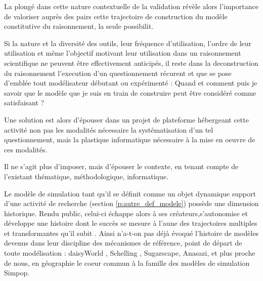 La plongé dans cette nature contextuelle de la validation révèle alors l'importance de valoriser auprès des pairs cette trajectoire de construction du modèle constitutive du raisonnement, la seule possibilit.

Si la nature et la diversité des outils, leur fréquence d'utilisation, l'ordre de leur utilisation et même l'objectif motivant leur utilisation dans un raisonnement scientifique ne peuvent être effectivement anticipés, il reste dans la deconstruction du raisonnement l'execution d'un questionnement récurent et que se pose d'emblée tout modélisateur débutant ou expérimenté : Quand et comment puis je savoir que le modèle que je suis en train de construire peut être considéré comme satisfaisant ?


Une solution est alors d'épouser dans un projet de plateforme hébergeant cette activité non pas les modalités nécessaire la systématisation d'un tel questionnement, mais la plastique informatique nécessaire à la mise en oeuvre de ces modalités. 

Il ne s'agit plus d'imposer, mais d'épouser le contexte, en tenant compte de l'existant thématique, méthodologique, informatique.


Le modèle de simulation tant qu'il se définit comme un objet dynamique support d'une activité de recherche (section \ref{p:autre_def_modele}) possède une dimension historique. Rendu public, celui-ci échappe alors à ses créateurs,s'autonomise et développe une histoire dont le succès se mesure à l'aune des trajectoires multiples et transformantes qu'il subit \autocite{Banos2013a}. Ainsi n'a-t-on pas déjà évoqué l'histoire de modèles devenus dans leur discipline des mécanismes de référence, point de départ de toute modélisation : daisyWorld \autocite{Dutreuil2013}, Schelling \autocite {Bulle2005}, Sugarscape, Anasazi, et plus proche de nous, en géographie le coeur commun à la famille des modèles de simulation Simpop. 

